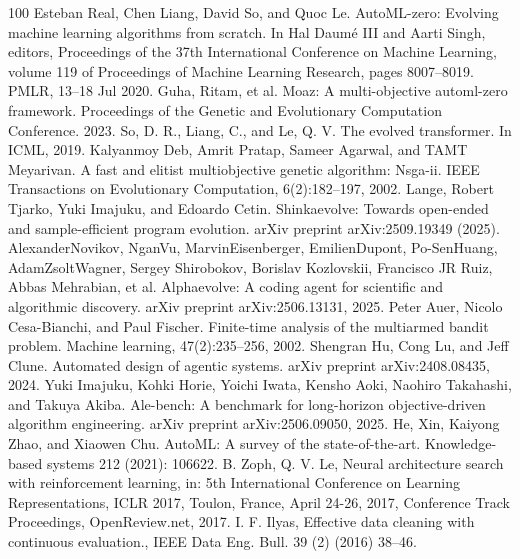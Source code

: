\documentclass[a4paper,14pt]{extarticle}
\begin{document}

\newpage
\begin{thebibliography}{100}
     Esteban Real, Chen Liang, David So, and Quoc Le. AutoML-zero: Evolving machine learning algorithms from scratch. In Hal Daumé III and Aarti Singh, editors, Proceedings of the 37th International Conference on Machine Learning, volume 119 of Proceedings of Machine Learning Research, pages 8007–8019. PMLR, 13–18 Jul 2020.
     Guha, Ritam, et al. Moaz: A multi-objective automl-zero framework. Proceedings of the Genetic and Evolutionary Computation Conference. 2023.
     So, D. R., Liang, C., and Le, Q. V. The evolved transformer. In ICML, 2019.
     Kalyanmoy Deb, Amrit Pratap, Sameer Agarwal, and TAMT Meyarivan. A fast and elitist multiobjective genetic algorithm: Nsga-ii. IEEE Transactions on Evolutionary Computation, 6(2):182–197, 2002.
     Lange, Robert Tjarko, Yuki Imajuku, and Edoardo Cetin. Shinkaevolve: Towards open-ended and sample-efficient program evolution. arXiv preprint arXiv:2509.19349 (2025).
     AlexanderNovikov, NganVu, MarvinEisenberger, EmilienDupont, Po-SenHuang, AdamZsoltWagner, Sergey Shirobokov, Borislav Kozlovskii, Francisco JR Ruiz, Abbas Mehrabian, et al. Alphaevolve: A coding agent for scientific and algorithmic discovery. arXiv preprint arXiv:2506.13131, 2025.
     Peter Auer, Nicolo Cesa-Bianchi, and Paul Fischer. Finite-time analysis of the multiarmed bandit problem. Machine learning, 47(2):235–256, 2002.
     Shengran Hu, Cong Lu, and Jeff Clune. Automated design of agentic systems. arXiv preprint arXiv:2408.08435, 2024.
     Yuki Imajuku, Kohki Horie, Yoichi Iwata, Kensho Aoki, Naohiro Takahashi, and Takuya Akiba. Ale-bench: A benchmark for long-horizon objective-driven algorithm engineering. arXiv preprint arXiv:2506.09050, 2025.
     He, Xin, Kaiyong Zhao, and Xiaowen Chu. AutoML: A survey of the state-of-the-art. Knowledge-based systems 212 (2021): 106622.
     B. Zoph, Q. V. Le, Neural architecture search with reinforcement learning, in: 5th International Conference on Learning Representations, ICLR 2017, Toulon, France, April 24-26, 2017, Conference Track Proceedings, OpenReview.net, 2017.
     I. F. Ilyas, Eﬀective data cleaning with continuous evaluation., IEEE Data Eng. Bull. 39 (2) (2016) 38–46.

\end{thebibliography}
\end{document}
